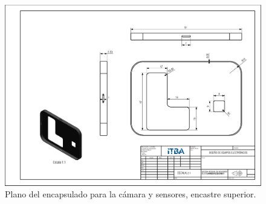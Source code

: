 \begin{figure}[H]
	\centering
	\includegraphics[width=\linewidth]{ImagenesApendice/TapaPlano}
	\caption{Plano del encapsulado para la cámara y sensores, encastre superior.}
	\label{fig:TapaPlano}
\end{figure}